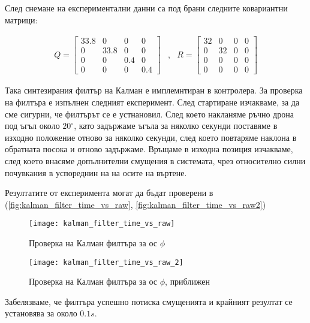 След снемане на експериментални данни са под брани следните
ковариантни матрици:

\begin{align}
    Q =
    \begin{bmatrix}
        33.8 & 0 & 0 & 0 \\
        0 & 33.8 & 0 & 0 \\
        0 & 0 & 0.4 & 0 \\
        0 & 0 & 0 & 0.4
    \end{bmatrix} &,&
    R = \begin{bmatrix}
        32 & 0 & 0 & 0 \\
        0 & 32 & 0 & 0 \\
        0 & 0 & 0 & 0 \\
        0 & 0 & 0 & 0
    \end{bmatrix}
\end{align}

Така синтезирания филтър на Калман е имплемнтиран в контролера.
За проверка на филтъра е изпълнен следният експеримент.
След стартиране изчакваме, за да сме сигурни, че филтърът се е устнановил.
След което накланяме ръчно дрона под ъгъл около \(20^{\circ}\), 
като задържаме ъгъла за няколко секунди поставяме в 
изходно положение отново за няколко секунди,
след което повтаряме наклона в обратната посока и отново задържаме.
Връщаме в изходна позиция изчакваме, след което внасяме допълнителни смущения в системата,
чрез относително силни почувкания в успореднин на на осите на въртене.

Резултатите от експеримента могат да бъдат проверени в (\autoref{fig:kalman_filter_time_vs_raw}, \autoref{fig:kalman_filter_time_vs_raw2})

\begin{figure}[htpb!]
    \centering
    \texttt{[image: kalman\_filter\_time\_vs\_raw]}
    \caption{Проверка на Калман филтъра за ос \(\phi\)}
    \label{fig:kalman_filter_time_vs_raw}
\end{figure}

\begin{figure}[htpb!]
    \centering
    \texttt{[image: kalman\_filter\_time\_vs\_raw\_2]}
    \caption{Проверка на Калман филтъра за ос \(\phi\), приближен}
    \label{fig:kalman_filter_time_vs_raw2}
\end{figure}

Забелязваме, че филтъра успешно потиска смущенията и крайният резултат се установява за около \(0.1s\).

